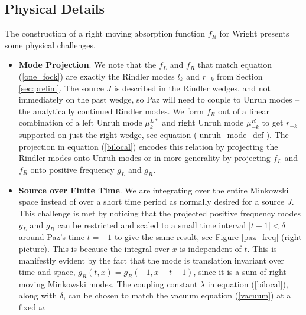 \documentclass[12pt,a4paper]{article}
\begin{document}
{\subsection{Physical Details} \label{sec:drive_phy}

The construction of a right moving absorption function $f_R$ for Wright presents some physical challenges.

\begin{itemize}
\item {\bf Mode Projection}. We note that the $f_L$ and $f_R$ that match equation (\ref{one_fock}) are exactly the Rindler modes $l_k$ and $r_{-k}$ from Section \ref{sec:prelim}. The source $J$ is described in the Rindler wedges, and not immediately on the past wedge, so Paz will need to couple to Unruh modes -- the analytically continued Rindler modes.  We form $f_R$ out of a linear combination of a left Unruh mode $\mu^{L*}_{k}$ and right Unruh mode $\mu^R_{-k}$ to get $r_{-k}$ supported on just the right wedge, see equation (\ref{unruh_mode_def}).  The projection in equation (\ref{bilocal}) encodes this relation by projecting the Rindler modes onto Unruh modes or in more generality by projecting $f_L$ and $f_R$ onto positive frequency $g_L$ and $g_R$.

\item{\bf Source over Finite Time}. We are integrating over the entire Minkowski space instead of over a short time period as normally desired for a source $J$.  This challenge is met by noticing that the projected positive frequency modes $g_L$ and $g_R$ can be restricted and scaled to a small time interval $|t + 1| < \delta$ around Paz's time $t=-1$ to give the same result, see Figure \ref{paz_freq} (right picture). This is because the integral over $x$ is independent of $t$. This is manifestly evident by the fact that the mode is translation invariant over time and space, $g_R(t,x) = g_R(-1,x+t+1)$, since it is a sum of right moving Minkowski modes. The coupling constant $\lambda$ in equation (\ref{bilocal}), along with $\delta$, can be chosen to match the vacuum equation (\ref{vacuum}) at a fixed $\omega$.


\end{itemize}}
\end{document}
